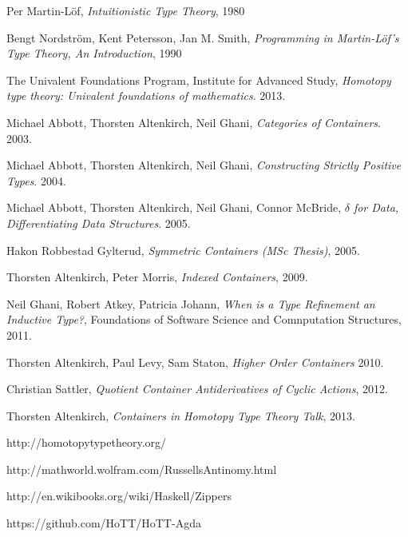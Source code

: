 \documentclass[12pt]{report}
\begin{document}
\begin{thebibliography}{10}

  Per Martin-L\"of,
  \emph{Intuitionistic Type Theory},
  1980

  Bengt Nordstr\"om, Kent Petersson, Jan M. Smith,
  \emph{Programming in Martin-L\"of's Type Theory, An Introduction},
  1990

  The Univalent Foundations Program, Institute for Advanced Study,
  \emph{Homotopy type theory: Univalent foundations of mathematics}.
  2013.

  Michael Abbott, Thorsten Altenkirch, Neil Ghani,
  \emph{Categories of Containers}.
  2003.

  Michael Abbott, Thorsten Altenkirch, Neil Ghani,
  \emph{Constructing Strictly Positive Types}.
  2004.
  
  Michael Abbott, Thorsten Altenkirch, Neil Ghani, Connor McBride,
  \emph{$\delta$ for Data, Differentiating Data Structures}.
  2005.

  Hakon Robbestad Gylterud,
  \emph{Symmetric Containers (MSc Thesis)},
  2005.
  
  Thorsten Altenkirch, Peter Morris,
  \emph{Indexed Containers},
  2009.
  
  Neil Ghani, Robert Atkey, Patricia Johann,
  \emph{When is a Type Refinement an Inductive Type?},
  Foundations of Software Science and Comnputation Structures,
  2011.
  
  Thorsten Altenkirch, Paul Levy, Sam Staton,
  \emph{Higher Order Containers}
  2010.
  
  Christian Sattler,
  \emph{Quotient Container Antiderivatives of Cyclic Actions},
  2012.
  
  Thorsten Altenkirch,
  \emph{Containers in Homotopy Type Theory Talk},
  2013.
  
  http://homotopytypetheory.org/
  
  http://mathworld.wolfram.com/RussellsAntinomy.html
  
  http://en.wikibooks.org/wiki/Haskell/Zippers
  
  https://github.com/HoTT/HoTT-Agda

\end{thebibliography}
\cleardoublepage
{}
{}
\end{document}
